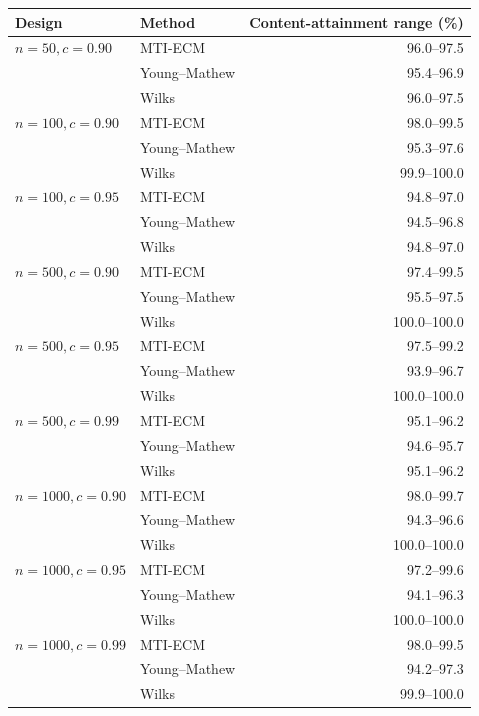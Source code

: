 \begin{tabular}{@{}l@{\hspace{0.75em}}l@{\hspace{0.75em}}r@{}}
\toprule
Design & Method & Content-attainment range (\%)\\
\midrule
\(n=50, c=0.90\) & MTI-ECM & 96.0--97.5\\
 & Young--Mathew & 95.4--96.9\\
 & Wilks & 96.0--97.5\\
\addlinespace[0.3em]
\(n=100, c=0.90\) & MTI-ECM & 98.0--99.5\\
 & Young--Mathew & 95.3--97.6\\
 & Wilks & 99.9--100.0\\
\addlinespace[0.3em]
\(n=100, c=0.95\) & MTI-ECM & 94.8--97.0\\
 & Young--Mathew & 94.5--96.8\\
 & Wilks & 94.8--97.0\\
\addlinespace[0.3em]
\(n=500, c=0.90\) & MTI-ECM & 97.4--99.5\\
 & Young--Mathew & 95.5--97.5\\
 & Wilks & 100.0--100.0\\
\addlinespace[0.3em]
\(n=500, c=0.95\) & MTI-ECM & 97.5--99.2\\
 & Young--Mathew & 93.9--96.7\\
 & Wilks & 100.0--100.0\\
\addlinespace[0.3em]
\(n=500, c=0.99\) & MTI-ECM & 95.1--96.2\\
 & Young--Mathew & 94.6--95.7\\
 & Wilks & 95.1--96.2\\
\addlinespace[0.3em]
\(n=1000, c=0.90\) & MTI-ECM & 98.0--99.7\\
 & Young--Mathew & 94.3--96.6\\
 & Wilks & 100.0--100.0\\
\addlinespace[0.3em]
\(n=1000, c=0.95\) & MTI-ECM & 97.2--99.6\\
 & Young--Mathew & 94.1--96.3\\
 & Wilks & 100.0--100.0\\
\addlinespace[0.3em]
\(n=1000, c=0.99\) & MTI-ECM & 98.0--99.5\\
 & Young--Mathew & 94.2--97.3\\
 & Wilks & 99.9--100.0\\
\bottomrule
\end{tabular}
